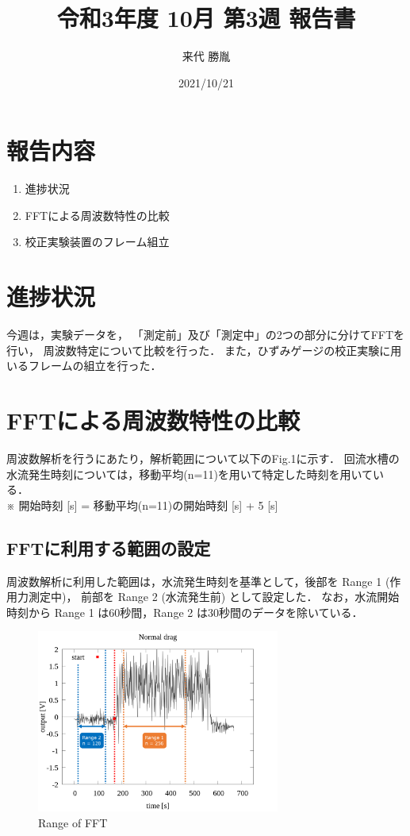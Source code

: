 \documentclass[twocolumn,a4j]{jsarticle}
\author{来代 勝胤}
\title{令和3年度 10月 第3週 報告書}
\date{2021/10/21}
\begin{document}
\columnseprule=0.1mm

\maketitle
\section*{報告内容}
\begin{enumerate}[1.]
    \item 進捗状況
    \item FFTによる周波数特性の比較
    \item 校正実験装置のフレーム組立
\end{enumerate}

\section{進捗状況}
今週は，実験データを，
「測定前」及び「測定中」の2つの部分に分けてFFTを行い，
周波数特定について比較を行った．
また，ひずみゲージの校正実験に用いるフレームの組立を行った．

\section{FFTによる周波数特性の比較}
周波数解析を行うにあたり，解析範囲について以下のFig.1に示す．
回流水槽の水流発生時刻については，移動平均(n=11)を用いて特定した時刻を用いている．\\
※ 開始時刻 [s] = 移動平均(n=11)の開始時刻 [s] + 5 [s]\\

\subsection{FFTに利用する範囲の設定}
周波数解析に利用した範囲は，水流発生時刻を基準として，後部を Range 1 (作用力測定中)，
前部を Range 2 (水流発生前) として設定した．
なお，水流開始時刻から Range 1 は60秒間，Range 2 は30秒間のデータを除いている．
\begin{figure}[htbp]
    \footnotesize
    \begin{center}
        \includegraphics[width=80mm]{../images/image_1.png}
        \caption{Range of FFT}
    \end{center}
\end{figure}
\end{document}
